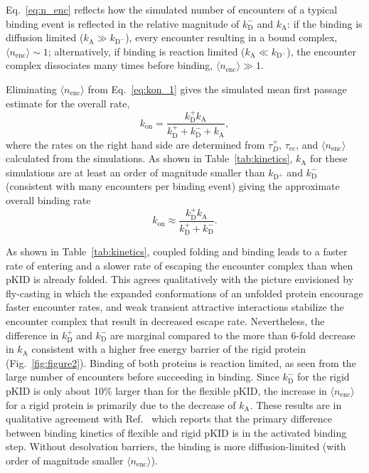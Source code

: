 \documentclass[../talant.diss.submit.tex]{subfiles}
\begin{document}
Eq.~\ref{eq:n_enc} reflects how the simulated number of encounters of a typical binding event
is reflected in the relative magnitude of $k_\mathrm{D}^{-}$ and $k_\mathrm{A}$: if
the binding is diffusion limited  ($k_{\mathrm{A}} \gg k_{\mathrm{D}^-}$), every
encounter resulting in a bound complex, $\langle n_{\mathrm{enc}}\rangle \sim 1$; alternatively,
if binding is reaction limited ($k_{\mathrm{A}} \ll k_{\mathrm{D}^-}$), the
encounter complex dissociates many times before binding,
$\langle n_{\mathrm{enc}}\rangle \gg 1$.

Eliminating $\langle n_\mathrm{enc}\rangle$ from Eq.~\ref{eq:kon_1} gives the
simulated mean first passage estimate for the overall rate,
\begin{equation}
  \label{eq:kon_2}
  k_\mathrm{on} =
  \frac{k_\mathrm{D}^{+} k_\mathrm{A}}{k_\mathrm{D}^{+}+ k_\mathrm{D}^{-} + k_\mathrm{A}},
\end{equation}
where the rates on the right hand side are determined from $\tau_{D}^{+}$,
$\tau_{\mathrm{ec}}$, and $\langle n_{\mathrm{enc}}\rangle$ calculated from the
simulations.  As shown in Table~\ref{tab:kinetics}, $k_\mathrm{A}$ for these
simulations are at least an order of magnitude smaller than $k_{\mathrm{D}^+}$
and $k_\mathrm{D}^{-}$ (consistent with many encounters per binding event)
giving the approximate overall binding rate
\begin{equation}
  \label{eq:kon_2}
  k_\mathrm{on} \approx
  \frac{k_\mathrm{D}^{+} k_\mathrm{A}}{k_\mathrm{D}^{+}+ k_\mathrm{D}^{-}}.
\end{equation}


As shown in Table~\ref{tab:kinetics}, coupled folding and binding leads to a
faster rate of entering and a slower rate of escaping the encounter complex than
when pKID is already folded. This agrees qualitatively with the picture
envisioned by fly-casting in which the expanded conformations of an unfolded
protein encourage faster encounter rates, and weak transient attractive
interactions stabilize the encounter complex that result in decreased escape
rate. Nevertheless, the difference in $k_\mathrm{D}^{+}$ and $k_\mathrm{D}^{-}$
are marginal compared to the more than 6-fold decrease in $k_\mathrm{A}$
consistent with a higher free energy barrier of the rigid protein
(Fig.~\ref{fig:figure2}). Binding of both proteins is reaction limited, as seen
from the large number of encounters before succeeding in binding. Since
$k_\mathrm{D}^{-}$ for the rigid pKID is only about 10\% larger than for the
flexible pKID, the increase in $\langle n_\mathrm{enc}\rangle$ for a rigid
protein is primarily due to the decrease of $k_\mathrm{A}$.  These results are
in qualitative agreement with Ref.~\cite{huang:09} which reports that the
primary difference between binding kinetics of flexible and rigid pKID is in the
activated binding step. Without desolvation barriers, the binding is more
diffusion-limited (with order of magnitude smaller
$\langle n_{\mathrm{enc}}\rangle$).
\end{document}
